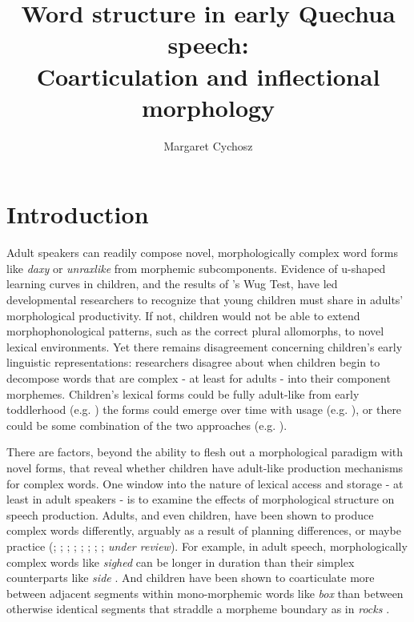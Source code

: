 \documentclass[a4paper,man,floatsintext,natbib,donotrepeattitle, apacite]{apa6}
\title{\LARGE Word structure in early Quechua speech: \\ Coarticulation and inflectional morphology}
\author[a]{\large Margaret Cychosz}
\affil[a]{\small University of California, Berkeley, Department of Linguistics, 1203 Dwinelle Hall, Berkeley, USA, \url{mcychosz@berkeley.edu}}
\affiliation{} %
\begin{document}
\justifying
\setlength\parindent{24pt} %

\maketitle

\setcounter{secnumdepth}{2} %


\section{Introduction}

Adult speakers can readily compose novel, morphologically complex word forms like \textit{daxy} or \textit{unraxlike} from morphemic subcomponents.  Evidence of u-shaped learning curves in children, and the results of \citet{berkoChildLearningEnglish1958}'s Wug Test, have led developmental researchers to recognize that young children must share in adults' morphological productivity. If not, children would not be able to extend morphophonological patterns, such as the correct plural allomorphs, to novel lexical environments. Yet there remains disagreement concerning children’s early linguistic representations: researchers disagree about when children begin to decompose words that are complex - at least for adults - into their component morphemes. Children's lexical forms could be fully adult-like from early toddlerhood (e.g. \citealt{wexlerVeryEarlyParameter1998}) the forms could emerge over time with usage (e.g. \citealt{ambridgeUbiquityFrequencyEffects2015}), or there could be some combination of the two approaches (e.g. \citealt{swingleyLexicalNeighborhoodsWordForm2002}). 

There are factors, beyond the ability to flesh out a morphological paradigm with novel forms, that reveal whether children have adult-like production mechanisms for complex words. One window into the nature of lexical access and storage - at least in adult speakers - is to examine the effects of morphological structure on speech production. Adults, and even children, have been shown to produce complex words differently, arguably as a result of planning differences, or maybe practice (\citealt{choEffectsMorphemeBoundaries2001}; \citealt{hayCausesConsequencesWord2003}; \citealt{lee-kimMorphologicalEffectsDarkness2013}; \citealt{plagPhonologicalPhoneticVariability2014}; \citealt{songDurationalCuesFricative2013}; \citealt{songEffectsCoarticulationMorphological2013};  \citealt{strycharczukPhoneticDetailPhonetic2019}; \citealt{sugaharaDurationalCorrelatesEnglish2009}; 
\citeauthor{tomaschekHowAnticipatoryCoarticulation2019} \textit{under review}). For example, in adult speech, morphologically complex words like \textit{sighed} can be longer in duration than their simplex counterparts like \textit{side} \citep{sugaharaDurationalCorrelatesEnglish2009}. And children have been shown to coarticulate more between adjacent segments within mono-morphemic words like \textit{box} than between otherwise identical segments that straddle a morpheme boundary as in \textit{rocks} \citep{songEffectsCoarticulationMorphological2013}. 
\end{document}
